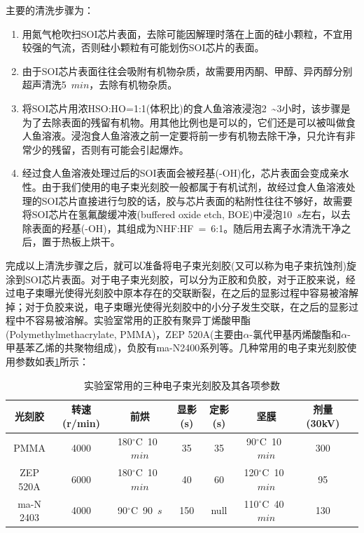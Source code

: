 主要的清洗步骤为：
\begin{enumerate}[(1)]
	\item 
	用氮气枪吹扫SOI芯片表面，去除可能因解理时落在上面的硅小颗粒，不宜用较强的气流，否则硅小颗粒有可能划伤SOI芯片的表面。
	\item 
	由于SOI芯片表面往往会吸附有机物杂质，故需要用丙酮、甲醇、异丙醇分别超声清洗5~$min$，去除有机物杂质。
	\item 
	将SOI芯片用浓HSO:HO=1:1(体积比)的食人鱼溶液浸泡2~\~{}3小时，该步骤是为了去除表面的残留有机物。用其他比例也是可以的，它们还是可以被叫做食人鱼溶液。浸泡食人鱼溶液之前一定要将前一步有机物去除干净，只允许有非常少的残留，否则有可能会引起爆炸。
	\item 
	经过食人鱼溶液处理过后的SOI表面会被羟基(-OH)化，芯片表面会变成亲水性。由于我们使用的电子束光刻胶一般都属于有机试剂，故经过食人鱼溶液处理的SOI芯片直接进行匀胶的话，胶与芯片表面的粘附性往往不够好，故需要将SOI芯片在氢氟酸缓冲液(buffered oxide etch, BOE)中浸泡10~$s$左右，以去除表面的羟基(-OH)，其组成为NHF:HF~=~6:1。随后用去离子水清洗干净之后，置于热板上烘干。
\end{enumerate}

完成以上清洗步骤之后，就可以准备将电子束光刻胶(又可以称为电子束抗蚀剂)旋涂到SOI芯片表面。对于电子束光刻胶，可以分为正胶和负胶，对于正胶来说，经过电子束曝光使得光刻胶中原本存在的交联断裂，在之后的显影过程中容易被溶解掉；对于负胶来说，电子束曝光使得光刻胶中的小分子发生交联，在之后的显影过程中不容易被溶解。实验室常用的正胶有聚异丁烯酸甲酯(Polymethylmethacrylate, PMMA)，ZEP 520A(主要由$\alpha$-氯代甲基丙烯酸酯和$\alpha$-甲基苯乙烯的共聚物组成)，负胶有ma-N2400系列等。几种常用的电子束光刻胶使用参数如表\ref{ebeamresist}所示：

\begin{table}[htb]
	\captionsetup{justification=centering}
	\caption{实验室常用的三种电子束光刻胶及其各项参数}
	\label{ebeamresist}
	\centering
	\begin{tabular}[t]{cccccccc}
		\hline
		\textbf{光刻胶} & \textbf{转速(r/min)}  & \textbf{前烘} & \textbf{显影(s)} & \textbf{定影(s)} & \textbf{坚膜} & \textbf{剂量(30kV)} \\
		\hline
		PMMA & 4000 &  180$^{\circ}$C~10~$min$ & 35 & 35 & 90$^{\circ}$C~10~$min$ & 300 \\
		\hline
		ZEP 520A & 6000 &  180$^{\circ}$C~10~$min$ & 40 & 60 & 120$^{\circ}$C~10~$min$ & 95 \\
		\hline
		ma-N 2403 & 4000 &  90$^{\circ}$C~90~$s$ & 150 & null & 110$^{\circ}$C~40~$min$ & 130 \\
		\hline
	\end{tabular}
\end{table}

